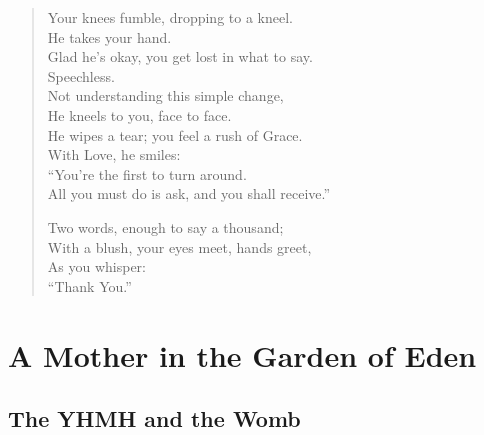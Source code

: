 \documentclass[11pt, letterpaper]{article}
\begin{document}
\begin{verse}
Your knees fumble, dropping to a kneel.\\
He takes your hand.\\
Glad he’s okay, you get lost in what to say.\\
Speechless.\\
Not understanding this simple change,\\
He kneels to you, face to face.\\
He wipes a tear; you feel a rush of Grace.\\
With Love, he smiles:\\
``You’re the first to turn around.\\
All you must do is ask, and you shall receive.''

Two words, enough to say a thousand;\\
With a blush, your eyes meet, hands greet,\\
As you whisper:\\
``Thank You.''
\end{verse}

\newpage

\section*{A Mother in the Garden of Eden}
\subsection*{The YHMH and the Womb}
\end{document}
